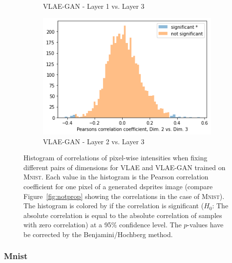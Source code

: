 \begin{figure}
\begin{subfigure}{.3\textwidth}
        \caption{\ac{VLAE}-\ac{GAN} - Layer 1 vs. Layer 3}
    \end{subfigure}
    \hfill
    \begin{subfigure}{.3\textwidth}
        \includegraphics[width=\textwidth]{images/notprop/dsprites/vlae_gan/dim_2_3.png}
        \caption{\ac{VLAE}-\ac{GAN} - Layer 2 vs. Layer 3}
    \end{subfigure}
    \caption[\ac{VLAE} and \ac{VLAE}-\ac{GAN} on \textsc{Mnist} - Pixel intensity correlation]{Histogram of correlations of pixel-wise intensities when fixing different pairs of dimensions for \ac{VLAE} and \ac{VLAE}-\ac{GAN} trained on \textsc{Mnist}.
    Each value in the histogram is the Pearson correlation coefficient for one pixel of a generated dsprites image (compare Figure~\ref{fig:notprop} showing the correlations in the case of \textsc{Mnist}).
    The histogram is colored by if the correlation is significant ($H_0$: The absolute correlation is equal to the absolute correlation of samples with zero correlation) at a 95\% confidence level.
    The $p$-values have be corrected by the Benjamini/Hochberg method.}
    \label{fig:mnist_vlae_notprop}
\end{figure}

\subsubsection{Mnist}


